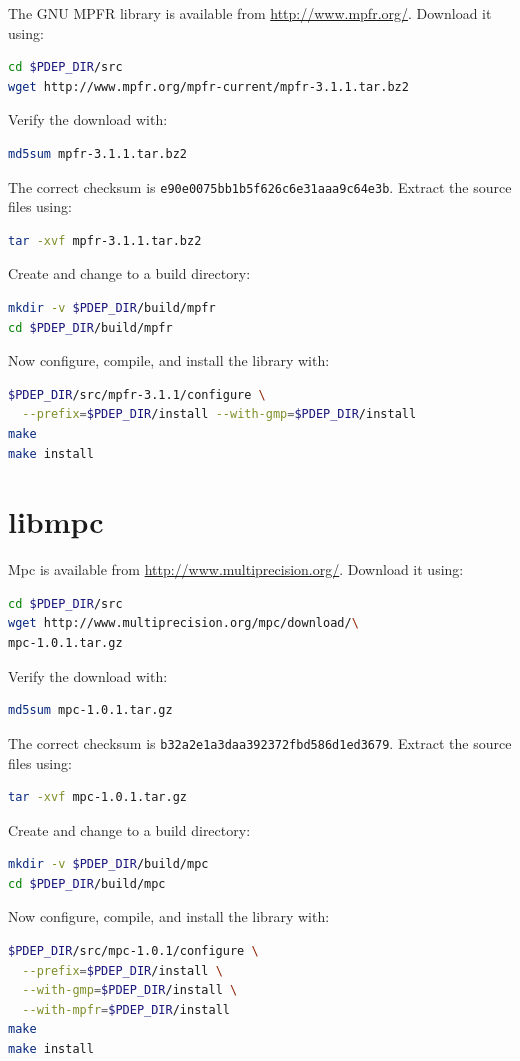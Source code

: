 \documentclass[a4paper]{article}
\begin{document}
The GNU MPFR library is available from \url{http://www.mpfr.org/}. Download it
using:
\begin{lstlisting}[language = bash, frame = single]
cd $PDEP_DIR/src
wget http://www.mpfr.org/mpfr-current/mpfr-3.1.1.tar.bz2
\end{lstlisting}
Verify the download with:
\begin{lstlisting}[language = bash, frame = single]
md5sum mpfr-3.1.1.tar.bz2
\end{lstlisting}
The correct checksum is \verb+e90e0075bb1b5f626c6e31aaa9c64e3b+. Extract the
source files using:
\begin{lstlisting}[language = bash, frame = single]
tar -xvf mpfr-3.1.1.tar.bz2
\end{lstlisting}
Create and change to a build directory:
\begin{lstlisting}[language = bash, frame = single]
mkdir -v $PDEP_DIR/build/mpfr
cd $PDEP_DIR/build/mpfr
\end{lstlisting}
Now configure, compile, and install the library with:
\begin{lstlisting}[language = bash, frame = single]
$PDEP_DIR/src/mpfr-3.1.1/configure \
  --prefix=$PDEP_DIR/install --with-gmp=$PDEP_DIR/install
make
make install
\end{lstlisting}

\section{libmpc}

Mpc is available from \url{http://www.multiprecision.org/}. Download it using:
\begin{lstlisting}[language = bash, frame = single]
cd $PDEP_DIR/src
wget http://www.multiprecision.org/mpc/download/\
mpc-1.0.1.tar.gz
\end{lstlisting}
Verify the download with:
\begin{lstlisting}[language = bash, frame = single]
md5sum mpc-1.0.1.tar.gz
\end{lstlisting}
The correct checksum is \verb+b32a2e1a3daa392372fbd586d1ed3679+. Extract the
source files using:
\begin{lstlisting}[language = bash, frame = single]
tar -xvf mpc-1.0.1.tar.gz
\end{lstlisting}
Create and change to a build directory:
\begin{lstlisting}[language = bash, frame = single]
mkdir -v $PDEP_DIR/build/mpc
cd $PDEP_DIR/build/mpc
\end{lstlisting}
Now configure, compile, and install the library with:
\begin{lstlisting}[language = bash, frame = single]
$PDEP_DIR/src/mpc-1.0.1/configure \
  --prefix=$PDEP_DIR/install \
  --with-gmp=$PDEP_DIR/install \
  --with-mpfr=$PDEP_DIR/install
make
make install
\end{lstlisting}
\end{document}
